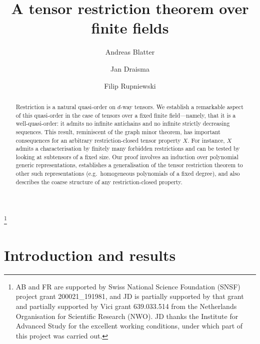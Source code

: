 \documentclass{amsart}
\begin{document}
\title{A tensor restriction theorem over finite fields}

\author{Andreas Blatter} 
\address{Mathematical Institute, University of Bern,
Alpeneggstrasse 22, 3012 Bern, Switzerland}

\author{Jan Draisma} 
\address{Mathematial Institute, University of Bern, Sidlerstrasse 5, 3012
Bern, Switzerland; and Department of Mathematics and Computer Science,
P.O. Box 513, 5600 MB, Eindhoven, the Netherlands}

\author{Filip Rupniewski}
\address{Mathematical Institute, University of Bern,
Alpeneggstrasse 22, 3012 Bern, Switzerland}

\thanks{AB and FR are supported by Swiss National Science Foundation
(SNSF) project grant 200021\_191981, and JD is partially supported by
that grant and partially supported by Vici grant 639.033.514 from the
Netherlands Organisation for Scientific Research (NWO). JD thanks the
Institute for Advanced Study for the excellent working conditions,
under which part of this project was carried out.}

\maketitle

\begin{abstract}
Restriction is a natural quasi-order on $d$-way tensors. We establish
a remarkable aspect of this quasi-order in the case of tensors over a
fixed finite field---namely, that it is a well-quasi-order: it admits no
infinite antichains and no infinite strictly decreasing sequences. This
result, reminiscent of the graph minor theorem, has important consequences
for an arbitrary restriction-closed tensor property $X$. For instance,
$X$ admits a characterisation by finitely many forbidden restrictions
and can be tested by looking at subtensors of a fixed size.  Our
proof involves an induction over polynomial generic representations,
establishes a generalisation of the tensor restriction theorem to other
such representations (e.g.~homogeneous polynomials of a fixed degree),
and also describes the coarse structure of any 
restriction-closed property. 
\end{abstract}

\section{Introduction and results}
\end{document}
